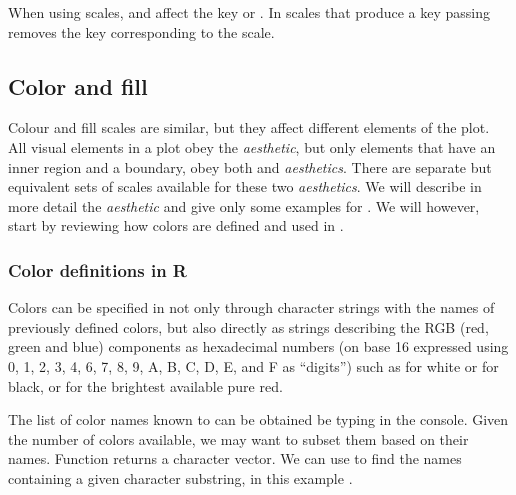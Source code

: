 \documentclass[krantz2]{krantz}\usepackage{knitr}%
\begin{document}
When using  scales,  and  affect the key or . In scales that produce a key passing  removes the key corresponding to the scale.

\subsection{Color and fill}

Colour and fill scales are similar, but they affect different elements of the plot. All visual elements in a plot obey the  \emph{aesthetic}, but only elements that have an inner region and a boundary, obey both  and  \emph{aesthetics}. There are separate but equivalent sets of scales available for these two \emph{aesthetics}. We will describe in more detail the  \emph{aesthetic} and give only some examples for . We will however, start by reviewing how colors are defined and used in \Rlang.

\subsubsection{Color definitions in R}\label{sec:plot:colors}
Colors can be specified in \Rlang not only through character strings with the names of previously defined colors, but also directly as strings describing the RGB (red, green and blue) components as hexadecimal numbers (on base 16 expressed using 0, 1, 2, 3, 4, 6, 7, 8, 9, A, B, C, D, E, and F as ``digits'') such as  for white or  for black, or  for the brightest available pure red.

The list of color names known to \Rlang can be obtained be typing  in the console.
Given the number of colors available, we may want to subset them based on their names. Function  returns a character vector. We can use  to find the names containing a given character substring, in this example .
\end{document}
